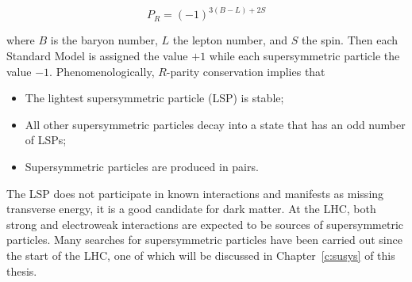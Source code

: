 $$P_R = (-1)^{3(B-L)+2S}$$

where $B$ is the baryon number, $L$ the lepton number, and $S$ the spin. Then
each Standard Model is assigned the value $+1$ while each supersymmetric
particle the value $-1$. Phenomenologically, $R$-parity conservation implies
that

\begin{itemize}
	\item The lightest supersymmetric particle (LSP) is stable;
	\item All other supersymmetric particles decay into a state that has an odd
	      number of LSPs;
	\item Supersymmetric particles are produced in pairs.
\end{itemize}

The LSP does not participate in known interactions and manifests as missing
transverse energy, it is a good candidate for dark matter. At the LHC, both
strong and electroweak interactions are expected to be sources of
supersymmetric particles. Many searches for supersymmetric particles have been
carried out since the start of the LHC, one of which will be discussed in
Chapter~\ref{c:susys} of this thesis.

